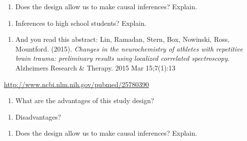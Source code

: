 \documentclass[
]{report}
\providecommand{\tightlist}{%
  \setlength{\itemsep}{0pt}\setlength{\parskip}{0pt}}
\begin{document}
\vspace{0.5in}

\begin{enumerate}
\def\labelenumi{\alph{enumi})}
\setcounter{enumi}{2}
\tightlist
\item
  Does the design allow us to make causal inferences? Explain.
\end{enumerate}

\vspace{0.5in}

\begin{enumerate}
\def\labelenumi{\alph{enumi})}
\setcounter{enumi}{3}
\tightlist
\item
  Inferences to high school students? Explain.
\end{enumerate}

\vspace{0.5in}

\begin{enumerate}
\def\labelenumi{\arabic{enumi}.}
\setcounter{enumi}{3}
\tightlist
\item
  And you read this abstract:
  Lin, Ramadan, Stern, Box, Nowinski, Ross, Mountford. (2015). \emph{Changes in the neurochemistry of athletes with repetitive brain trauma: preliminary results using localized correlated spectroscopy.} Alzheimers Research \& Therapy.
  2015 Mar 15;7(1):13
\end{enumerate}

\url{http://www.ncbi.nlm.nih.gov/pubmed/25780390}

\begin{enumerate}
\def\labelenumi{\alph{enumi})}
\tightlist
\item
  What are the advantages of this study design?
\end{enumerate}

\vspace{0.5in}

\begin{enumerate}
\def\labelenumi{\alph{enumi})}
\setcounter{enumi}{1}
\tightlist
\item
  Disadvantages?
\end{enumerate}

\vspace{0.5in}
\newpage

\begin{enumerate}
\def\labelenumi{\alph{enumi})}
\setcounter{enumi}{2}
\tightlist
\item
  Does the design allow us to make causal inferences? Explain.
\end{enumerate}
\end{document}
